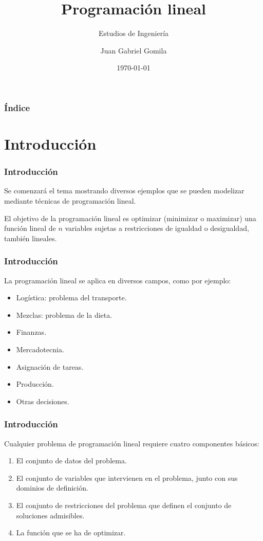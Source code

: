 \documentclass{beamer}
\title[Tema 6 - Programaci\'on Lineal]{Programaci\'on lineal}
\subtitle{Estudios de Ingenier\'ia}
\author[https://frogames.es]{
Juan Gabriel Gomila%
}
\institute[Frogames]{
 Frogames
   \and
  \texttt{https://frogames.es}
}
\date{\today}
\begin{document}
 

\frame{\titlepage}

\begin{frame}
  \frametitle{\'Indice}
  \tableofcontents
\end{frame}

\section{Introducci\'on}

\begin{frame}
\frametitle{Introducci\'on}
Se comenzar\'a el tema mostrando diversos ejemplos que se pueden modelizar mediante t\'ecnicas de programaci\'on lineal.

El objetivo de la programaci\'on lineal es optimizar (minimizar o maximizar) una funci\'on lineal de $n$ variables sujetas a restricciones de igualdad o desigualdad, tambi\'en lineales.
\end{frame}


\begin{frame}
\frametitle{Introducci\'on}
La programaci\'on lineal se aplica en diversos campos, como por ejemplo:
\begin{itemize}
\item Log\'istica: problema del transporte.
\item Mezclas: problema de la dieta.
\item Finanzas.
\item Mercadotecnia.
\item Asignaci\'on de tareas. 
\item Producci\'on.
\item Otras decisiones.
\end{itemize}
\end{frame}

\begin{frame}
\frametitle{Introducci\'on}
Cualquier problema de programaci\'on lineal requiere cuatro componentes b\'asicos:
\begin{enumerate}
\item El conjunto de datos del problema.
\item El conjunto de variables que intervienen en el problema, junto con sus dominios de definici\'on.
\item El conjunto de restricciones del problema que definen el conjunto de soluciones admisibles.
\item La funci\'on que se ha de optimizar.
\end{enumerate}
\end{frame}
\end{document}
